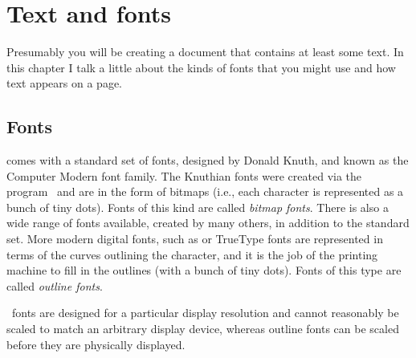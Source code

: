 \chapter{Text and fonts}

    Presumably you will be creating a document that contains at least some
text. In this chapter I talk a little about the kinds of fonts that you might
use and how text appears on a page.




\section{Fonts} \label{sec:fonts}

    \alltx{} comes with a standard set of fonts, designed by Donald Knuth,
and known as the Computer Modern font family. 
The Knuthian
fonts were created via the \metafont{} 
program~\cite{METAFONT,CM}
and are in the form of bitmaps
(i.e., each character is represented as a bunch of tiny dots). Fonts of
this kind are called \emph{bitmap fonts}.
 There is also a wide range of \metafont{} fonts available, created by 
many others, in addition to the standard set.  More modern
digital fonts, such as \pscript{} or 
TrueType fonts are represented in terms
of the curves outlining the character, and it is the job of the printing
machine to fill in the outlines (with a bunch of tiny dots). Fonts of
this type are called \emph{outline fonts}.

\metafont\ fonts
are designed for a particular display resolution and cannot reasonably 
be scaled to match an arbitrary display device, whereas outline fonts can be 
scaled before they are physically displayed.

